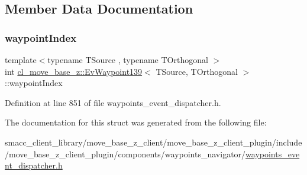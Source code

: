 \subsection{Member Data Documentation}
\mbox{\label{structcl__move__base__z_1_1EvWaypoint139_a470e12ea8c3e7b77d0fe708d6678dcd3}} 
\subsubsection{\texorpdfstring{waypoint\+Index}{waypointIndex}}
{\footnotesize\ttfamily template$<$typename T\+Source , typename T\+Orthogonal $>$ \\
int \hyperlink{structcl__move__base__z_1_1EvWaypoint139}{cl\+\_\+move\+\_\+base\+\_\+z\+::\+Ev\+Waypoint139}$<$ T\+Source, T\+Orthogonal $>$\+::waypoint\+Index}



Definition at line 851 of file waypoints\+\_\+event\+\_\+dispatcher.\+h.



The documentation for this struct was generated from the following file\+:\begin{DoxyCompactItemize}
\item 
smacc\+\_\+client\+\_\+library/move\+\_\+base\+\_\+z\+\_\+client/move\+\_\+base\+\_\+z\+\_\+client\+\_\+plugin/include/move\+\_\+base\+\_\+z\+\_\+client\+\_\+plugin/components/waypoints\+\_\+navigator/\hyperlink{waypoints__event__dispatcher_8h}{waypoints\+\_\+event\+\_\+dispatcher.\+h}\end{DoxyCompactItemize}
